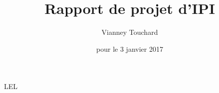 \documentclass[a4paper, titlepage]{article}
\title{Rapport de projet d'IPI}      %
\author{Vianney Touchard}           %
\date{pour le 3 janvier 2017}           %
\begin{document}
LEL
\end{document}
